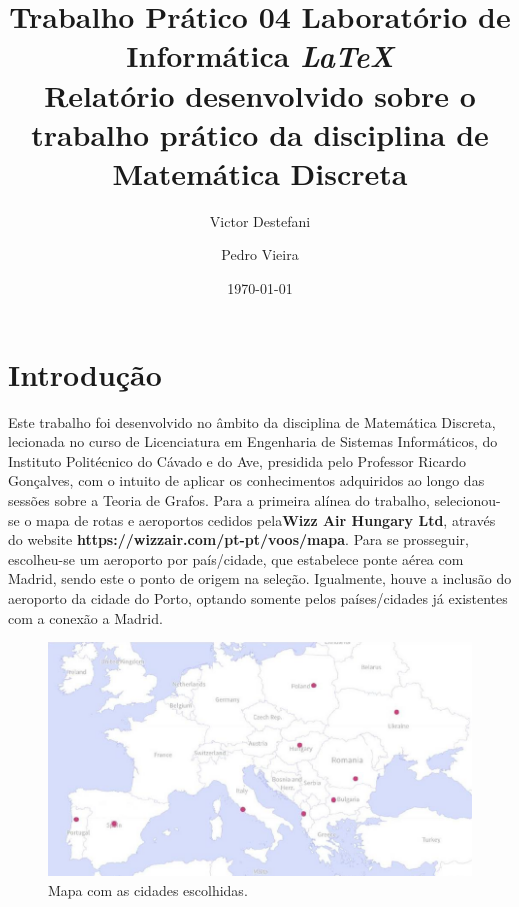 \documentclass{report}
\title{Trabalho Prático 04 Laboratório de Informática \textbf{\textit {LaTeX}}  \\ \normalsize \singlespacing Relatório desenvolvido sobre o trabalho prático da disciplina de Matemática Discreta}
\author{Victor Destefani \and Pedro Vieira}
\date{\today}
\begin{document}
\maketitle

 

\newpage
\listoffigures
\newpage
\listoftables

\chapter{Introdução}  

Este trabalho foi desenvolvido no âmbito da disciplina de Matemática Discreta, lecionada no curso de Licenciatura em Engenharia de Sistemas Informáticos, do Instituto Politécnico do Cávado e do Ave, presidida pelo Professor Ricardo Gonçalves, com o intuito de aplicar os conhecimentos adquiridos ao longo das sessões sobre a Teoria de Grafos. Para a primeira alínea do trabalho, selecionou-se o mapa de rotas e aeroportos cedidos pela\textbf{Wizz Air Hungary Ltd}, através do website \textbf{https://wizzair.com/pt-pt/voos/mapa}. Para se prosseguir, escolheu-se um aeroporto por país/cidade, que estabelece ponte aérea com Madrid, sendo este o ponto de origem na seleção. Igualmente, houve a inclusão do aeroporto da cidade do Porto, optando somente pelos países/cidades já existentes com a conexão a Madrid. \citet{costa_2018}

\begin{figure}[h]
    \centering
    \includegraphics[width=12cm]{Imagem_1_Geral.png}
    \caption{Mapa com as cidades escolhidas.}
    \label{fig1}
\end{figure}

\newpage
\end{document}
